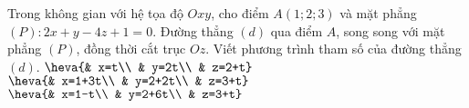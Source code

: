 \begin{ex}%
	Trong không gian với hệ tọa độ $Oxy$, cho điểm $A(1;2;3)$ và mặt phẳng $(P)\colon 2x+y-4z+1=0$. Đường thẳng $(d)$ qua điểm $A$, song song với mặt phẳng $(P)$, đồng thời cắt trục $Oz$. Viết phương trình tham số của đường thẳng $(d)$.
	{\True $\heva{& x=t\\ & y=2t\\ & z=2+t}$}
	{$\heva{& x=1+3t\\ & y=2+2t\\ & z=3+t}$}
	{$\heva{& x=1-t\\ & y=2+6t\\ & z=3+t}$}
\end{ex}

